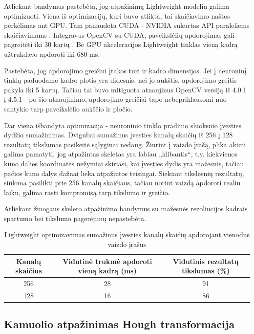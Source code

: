 \documentclass{VUMIFPSbakalaurinis}
\begin{document}
Atliekant bandymus pastebėta, jog atpažinimą Lightweight modeliu galima optimizuoti. Viena iš optimizacijų, kuri buvo atlikta, tai skaičiavimo naštos perkėlimas ant GPU. Tam panaudota CUDA - NVIDIA sukurtas API paraleliems skaičiavimams \cite{cuda}. Integravus OpenCV su CUDA, paveikslėlių apdorojimas gali pagreitėti iki 30 kartų \cite{opencv-cuda}. Be GPU akceleracijos Lightweight tinklas vieną kadrą užtrukdavo apdoroti iki 680 ms. 

Pastebėta, jog apdorojimo greičiui įtakos turi ir kadro dimensijos. Jei į neuroninį tinklą paduodamo kadro plotis yra didesnis, nei jo aukštis, apdorojimo greitis pakyla iki 5 kartų. Tačiau tai buvo mitiguota atnaujinus OpenCV versiją iš 4.0.1 į 4.5.1 - po šio atnaujinimo, apdorojimo greičiai tapo nebepriklausomi nuo santykio tarp paveikslėlio aukščio ir pločio. 

Dar viena išbandyta optimizacija - neuroninio tinklo pradinio sluoksnio įvesties dydžio sumažinimas. Dvigubai sumažinus įvesties kanalų skaičių iš 256 į 128 rezultatų tikslumas pasikeitė sąlyginai nedaug. Žiūrint į vaizdo įrašą, plika akimi galima pamatyti, jog atpažintas skeletas yra labiau „klibantis“, t.y. kiekvienos kūno dalies koordinatės nežymiai skiriasi, kai įvesties dydis yra mažesnis, tačiau pačios kūno dalys dažnai lieka atpažintos teisingai. Siekiant tikslesnių rezultatų, siūloma pasilikti prie 256 kanalų skaičiaus, tačiau norint vaizdą apdoroti realiu laiku, galima rasti kompromisą tarp tikslumo ir greičio. 

Atliekant žmogaus skeleto atpažinimo bandymus su mažesnės rezoliucijos kadrais spartumo bei tikslumo pagerėjimų nepastebėta.

\begin{table}[H]\footnotesize
	\centering
	\caption{Lightweight optimizavimas sumažinus įvesties kanalų skaičių apdorojant vienodus vaizdo įrašus}
	{\begin{tabular}{|c|c|c|} \hline
			\textbf{Kanalų skaičius} & \textbf{Vidutinė trukmė apdoroti vieną kadrą (ms)} & \textbf{Vidutinis rezultatų tikslumas (\%)} \\
			\hline
			256  & 28    & 91       \\
			\hline
			128  & 16    & 86       \\
			\hline
	\end{tabular}}
	\label{tab:openposevslightweight}
\end{table}

\subsection{Kamuolio atpažinimas Hough transformacija}
\end{document}
